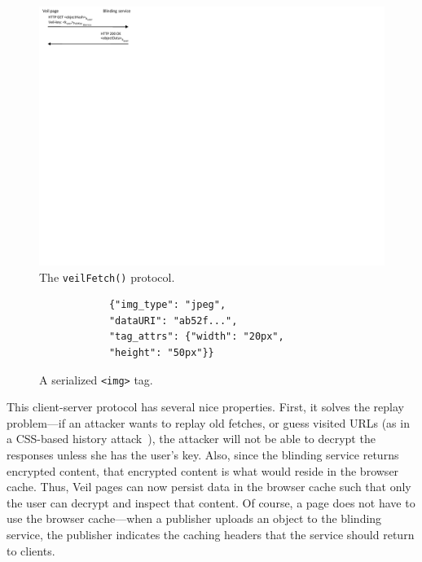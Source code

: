\begin{figure}[t]
	\centering
	\includegraphics{veil-figs/fetchProtocol_cropped}
	\caption{The \texttt{veilFetch()} protocol.}
	\label{fig:fetchProtocol}
\end{figure}

\begin{center}
\begin{figure}[t]
		\begin{BVerbatim}
		    {"img_type": "jpeg",
		    "dataURI": "ab52f...",
		    "tag_attrs": {"width": "20px",
		    "height": "50px"}}
		\end{BVerbatim}	
	\caption{A serialized \texttt{<img>} tag.}
	\label{fig:imgJson}
\end{figure}
\end{center}

This client-server protocol has several nice
properties. First, it solves the replay
problem---if an attacker wants to replay
old fetches, or guess visited URLs (as in a
CSS-based history attack~\cite{cssHistoryAttack,cssHistoryAttack2}),
the attacker will not be able to decrypt the
responses unless she has the user's key. Also,
since the blinding service returns encrypted
content, that encrypted content is what would
reside in the browser cache. Thus, Veil pages
can now persist data in the browser cache
such that only the user can decrypt and inspect
that content. Of course, a page does not have
to use the browser cache---when a publisher
uploads an object to the blinding service,
the publisher indicates the caching headers that the
service should return to clients.

